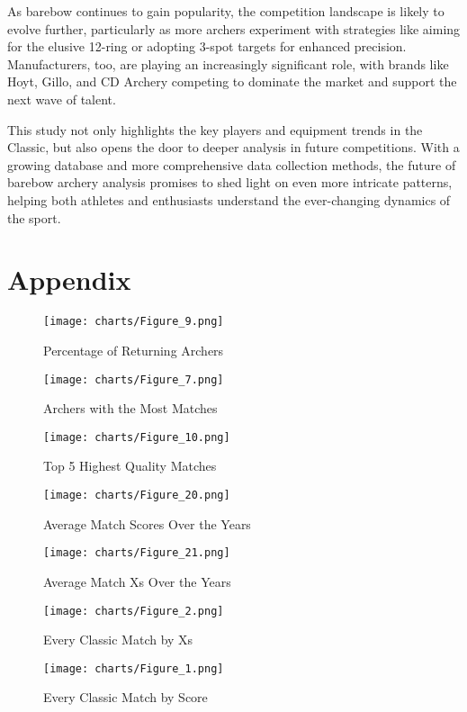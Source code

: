 \documentclass{article}
\begin{document}
As barebow continues to gain popularity, the competition landscape is likely to evolve further, particularly as more archers experiment with strategies like aiming for the elusive 12-ring or adopting 3-spot targets for enhanced precision. Manufacturers, too, are playing an increasingly significant role, with brands like Hoyt, Gillo, and CD Archery competing to dominate the market and support the next wave of talent. 

This study not only highlights the key players and equipment trends in the Classic, but also opens the door to deeper analysis in future competitions. With a growing database and more comprehensive data collection methods, the future of barebow archery analysis promises to shed light on even more intricate patterns, helping both athletes and enthusiasts understand the ever-changing dynamics of the sport.

\newpage
\section{Appendix}

\begin{figure}[ht]
    \centering
    \texttt{[image: charts/Figure\_9.png]}
    \caption{Percentage of Returning Archers}
    \label{fig:figure1}
\end{figure}

\begin{figure}[ht]
    \centering
    \texttt{[image: charts/Figure\_7.png]}
    \caption{Archers with the Most Matches}
    \label{fig:figure2}
\end{figure}

\begin{figure}[ht]
    \centering
    \texttt{[image: charts/Figure\_10.png]}
    \caption{Top 5 Highest Quality Matches}
    \label{fig:figure3}
\end{figure}

\begin{figure}[ht]
    \centering
    \texttt{[image: charts/Figure\_20.png]}
    \caption{Average Match Scores Over the Years}
    \label{fig:figure4}
\end{figure}

\begin{figure}[ht]
    \centering
    \texttt{[image: charts/Figure\_21.png]}
    \caption{Average Match Xs Over the Years}
    \label{fig:figure5}
\end{figure}

\begin{figure}[ht]
    \centering
    \texttt{[image: charts/Figure\_2.png]}
    \caption{Every Classic Match by Xs}
    \label{fig:figure6}
\end{figure}
\begin{figure}[ht]
    \centering
    \texttt{[image: charts/Figure\_1.png]}
    \caption{Every Classic Match by Score}
    \label{fig:figure7}
\end{figure}
\end{document}
